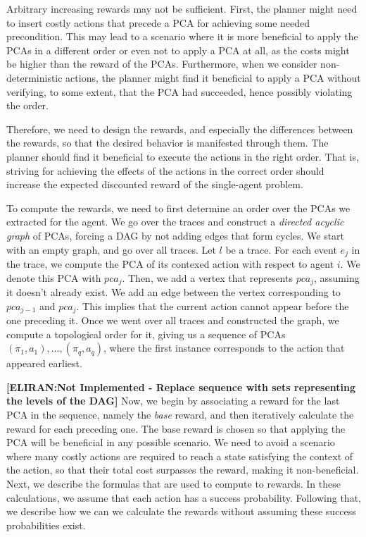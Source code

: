 \documentclass[letterpaper]{article} %
\newcommand{\eliran}[1]{\textbf{[\color{red}ELIRAN:#1]}}
\begin{document}
Arbitrary increasing rewards may not be sufficient. First, the planner might need to insert costly actions that precede a PCA for achieving some needed precondition. This may lead to a scenario where it is more beneficial to apply the PCAs in a different order or even not to apply a PCA at all, as the costs might be higher than the reward of the PCAs. 
Furthermore, when we consider non-deterministic actions, the planner might find it beneficial to apply a PCA without verifying, to some extent, that the PCA had succeeded, hence possibly violating the order.

Therefore, we need to design the rewards, and especially the differences between the rewards, so that the desired behavior is manifested through them. The planner should find it beneficial to execute the actions in the right order. That is, striving for achieving the effects of the actions in the correct order should increase the expected discounted reward of the single-agent problem.

To compute the rewards, we need to first determine an order over the PCAs we extracted for the agent.
We go over the traces and construct a \emph{directed acyclic graph} of PCAs, forcing a DAG by not adding edges that form cycles.
We start with an empty graph, and go over all traces. Let $l$ be a trace. For each event $e_j$ in the trace, we compute the PCA of its contexed action with respect to agent $i$. We denote this PCA with $pca_j$.
Then, we add a vertex that represents $pca_j$, assuming it doesn't already exist. We add an edge between the vertex corresponding to $pca_{j-1}$ and $pca_j$.
This implies that the current action cannot appear before the one preceding it.
Once we went over all traces and constructed the graph, we compute a topological order
for it, giving us a sequence of PCAs $(\pi_1, a_1),..., (\pi_q, a_q)$, where the first instance corresponds to the action that appeared earliest.

\eliran{Not Implemented - Replace sequence with sets representing the levels of the DAG}
Now, we begin by associating a reward for the last PCA in the sequence, namely the \emph{base} reward, and then iteratively calculate the reward for each preceding one.
The base reward is chosen so that applying the PCA will be beneficial in any possible scenario. We need to avoid a scenario where many costly actions are required to reach a state satisfying the context of the action, so that their total cost surpasses the reward, making it non-beneficial.
Next, we describe the formulas that are used to compute to rewards. In these calculations, we assume that each action has a success probability. Following that, we describe how we can we calculate the rewards without assuming these success probabilities exist.
\end{document}
